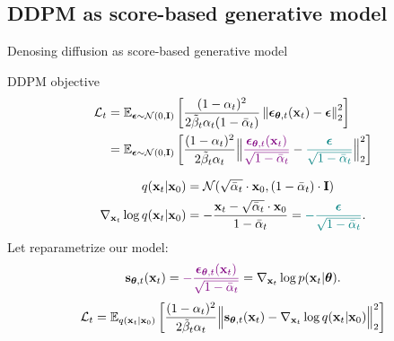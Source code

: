 \subsection{DDPM as score-based generative model}
\begin{frame}{Denosing diffusion as score-based generative model}
	\begin{block}{DDPM objective}
		\vspace{-0.7cm}
		\begin{align*}
			\mathcal{L}_t &= \mathbb{E}_{\boldsymbol{\epsilon} \sim \mathcal{N}(0, \mathbf{I})} \left[ \frac{(1 - \alpha_t)^2}{2\tilde{\beta}_t \alpha_t  (1 - \bar{\alpha}_t)}  \left\|  \boldsymbol{\epsilon}_{\boldsymbol{\theta}, t} (\mathbf{x}_t) - \boldsymbol{\epsilon}\right\|_2^2  \right] \\
			& = \mathbb{E}_{\boldsymbol{\epsilon} \sim \mathcal{N}(0, \mathbf{I})} \left[ \frac{(1 - \alpha_t)^2}{2\tilde{\beta}_t \alpha_t }  \Bigl\| {\color{violet} \frac{\boldsymbol{\epsilon}_{\boldsymbol{\theta}, t}  (\mathbf{x}_t) }{\sqrt{1 - \bar{\alpha}_t}}} - {\color{teal}\frac{\boldsymbol{\epsilon}}{\sqrt{1 - \bar{\alpha}_t}}}\Bigr\|_2^2  \right]
		\end{align*}
		\vspace{-0.7cm}
	\end{block}
	\vspace{-0.5cm}
	\begin{align*}
		q(\mathbf{x}_t | \mathbf{x}_0) &= \mathcal{N}(\sqrt{\bar{\alpha}_t} \cdot \mathbf{x}_0, (1 - \bar{\alpha}_t) \cdot \mathbf{I}) \\
		\nabla_{\mathbf{x}_t} \log q(\mathbf{x}_t | \mathbf{x}_0) &= - \frac{\mathbf{x}_t - \sqrt{\bar{\alpha}_t} \cdot \mathbf{x}_0}{1 - \bar{\alpha}_t} = {\color{teal}-  \frac{\boldsymbol{\epsilon}}{\sqrt{1 - \bar{\alpha}_t}}}.
	\end{align*}
		Let reparametrize our model: 
		\vspace{-0.2cm}
		\[
			\mathbf{s}_{\boldsymbol{\theta}, t}(\mathbf{x}_t) = {\color{violet}- \frac{\boldsymbol{\epsilon}_{\boldsymbol{\theta}, t}(\mathbf{x}_t)}{\sqrt{1 - \bar{\alpha}_t}}} = \nabla_{\mathbf{x}_t} \log p(\mathbf{x}_t | \boldsymbol{\theta}).
		\]
		\[
			\mathcal{L}_t = \mathbb{E}_{q(\mathbf{x}_t | \mathbf{x}_0)} \left[ \frac{(1 - \alpha_t)^2}{2\tilde{\beta}_t \alpha_t}  \Bigl\|  \mathbf{s}_{\boldsymbol{\theta}, t} (\mathbf{x}_t) - \nabla_{\mathbf{x}_t} \log q(\mathbf{x}_t | \mathbf{x}_0) \Bigr\|_2^2  \right]
		\]
	\end{frame}
